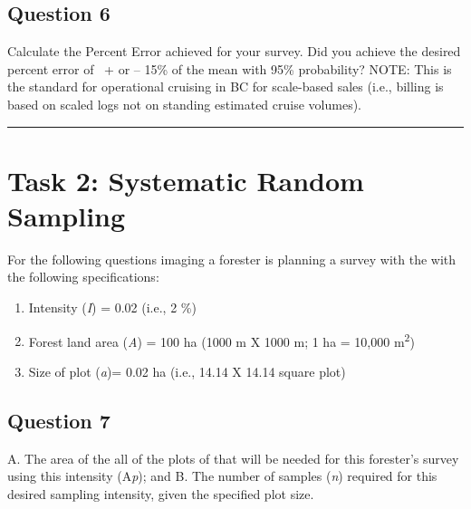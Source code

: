 \documentclass[
  letterpaper,
]{book}
\begin{document}
\hypertarget{question-6-1}{%
\subsection*{Question 6}\label{question-6-1}}

Calculate the Percent Error achieved for your survey. Did you achieve
the desired percent error of~ + or -- 15\% of the mean with 95\%
probability? NOTE: This is the standard for operational cruising in BC
for scale-based sales (i.e., billing is based on scaled logs not on
standing estimated cruise volumes).

\begin{center}\rule{0.5\linewidth}{0.5pt}\end{center}

\hypertarget{task-2-systematic-random-sampling}{%
\section*{Task 2: Systematic Random
Sampling}\label{task-2-systematic-random-sampling}}


For the following questions imaging a forester is planning a survey with
the with the following specifications:

\begin{enumerate}
\def\labelenumi{\Alph{enumi}.}
\item
  Intensity (\emph{I}) = 0.02 (i.e., 2 \%)
\item
  Forest land area (\emph{A}) = 100 ha (1000 m X 1000 m; 1 ha = 10,000
  m\textsuperscript{2})
\item
  Size of plot (\emph{a})= 0.02 ha (i.e., 14.14 X 14.14 square plot)
\end{enumerate}

\hypertarget{question-7-1}{%
\subsection*{Question 7}\label{question-7-1}}

A. The area of the all of the plots of that will be needed for this
forester's survey using this intensity (A\emph{p}); and B. The number of
samples (\emph{n}) required for this desired sampling intensity, given
the specified plot size.
\end{document}
